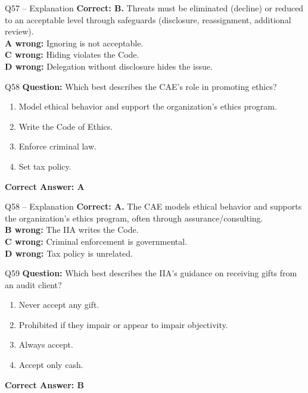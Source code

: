 \documentclass[aspectratio=169,10pt]{beamer}
\begin{document}
	\begin{frame}[t]{Q57 -- Explanation}
		\small
		\textbf{Correct: B.} Threats must be eliminated (decline) or reduced to an acceptable level through safeguards (disclosure, reassignment, additional review). \\[4pt]
		\textbf{A wrong:} Ignoring is not acceptable. \\[2pt]
		\textbf{C wrong:} Hiding violates the Code. \\[2pt]
		\textbf{D wrong:} Delegation without disclosure hides the issue.
	\end{frame}
	
	\begin{frame}[t]{Q58}
		\small
		\textbf{Question:} Which best describes the CAE's role in promoting ethics?
		\begin{enumerate}[label=\Alph*.,itemsep=1pt,topsep=2pt]
			\item Model ethical behavior and support the organization's ethics program.
			\item Write the Code of Ethics.
			\item Enforce criminal law.
			\item Set tax policy.
		\end{enumerate}
		\vspace{4pt}
		\textbf{Correct Answer: A}
	\end{frame}
	
	\begin{frame}[t]{Q58 -- Explanation}
		\small
		\textbf{Correct: A.} The CAE models ethical behavior and supports the organization's ethics program, often through assurance/consulting. \\[4pt]
		\textbf{B wrong:} The IIA writes the Code. \\[2pt]
		\textbf{C wrong:} Criminal enforcement is governmental. \\[2pt]
		\textbf{D wrong:} Tax policy is unrelated.
	\end{frame}
	
	\begin{frame}[t]{Q59}
		\small
		\textbf{Question:} Which best describes the IIA's guidance on receiving gifts from an audit client?
		\begin{enumerate}[label=\Alph*.,itemsep=1pt,topsep=2pt]
			\item Never accept any gift.
			\item Prohibited if they impair or appear to impair objectivity.
			\item Always accept.
			\item Accept only cash.
		\end{enumerate}
		\vspace{4pt}
		\textbf{Correct Answer: B}
	\end{frame}
	
\end{document}
